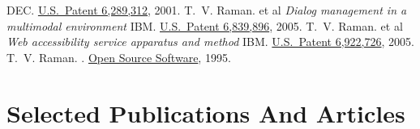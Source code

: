 \documentclass{article}
\begin{document}
\begin{plainbibliography}{}
\newblock DEC.  
\newblock
  \href{http://patft.uspto.gov/netacgi/nph-Parser?Sect1=PTO1&Sect2=HITOFF&d=PALL&p=1&u=/netahtml/srchnum.htm&r=1&f=G&l=50&s1='6289312'.WKU.&OS=PN/6289312&RS=PN/6289312}
  {U.S.\ Patent 6,289,312},  2001.
 T.~V. Raman.  et al 
\newblock
  \emph{Dialog management  in a
multimodal environment}
\newblock IBM.  
\newblock
  \href{http://patft.uspto.gov/netacgi/nph-Parser?Sect1=PTO1\&Sect2=HITOFF\&d=PALL\&p=1\&u=/netahtml/srchnum.htm\&r=1\&f=G\&l=50\&s1=6839896.WKU.\&OS=PN/6839896\&RS=PN/6839896}
  {U.S.\ Patent 6,839,896},  2005.
 T.~V. Raman.  et al 
\newblock
  \emph{Web accessibility service apparatus and method}
\newblock IBM.  
\newblock
  \href{http://patft.uspto.gov/netacgi/nph-Parser?Sect1=PTO1\&Sect2=HITOFF\&d=PALL\&p=1\&u=/netahtml/srchnum.htm\&r=1\&f=G\&l=50\&s1=6839896.WKU.\&OS=PN/6922726\&RS=PN/6839896}
  {U.S.\ Patent 6,922,726},  2005.
 T.~V. Raman.  
.
\newblock \href{http://emacspeak.sf.net}%
{Open Source Software},  1995.
\end{plainbibliography}

\section*{Selected Publications And Articles}
\end{document}
